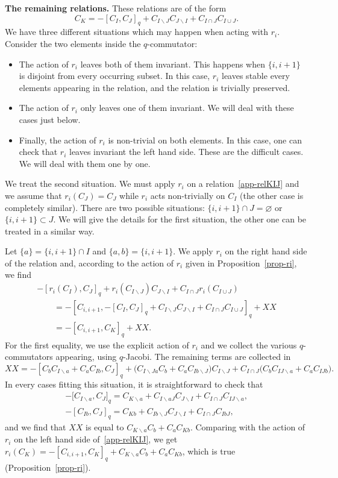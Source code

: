 \documentclass[pdftex]{sigma}
\numberwithin{equation}{section}
\theoremstyle{definition}
\begin{document}
{\bf The remaining relations.} These relations are of the form
\begin{equation}\label{app-relKIJ}
C_{K}=-[C_{I},C_{J}]_q+C_{I\backslash J}C_{J\backslash I}+C_{I\cap J}C_{I\cup J} .
\end{equation}
We have three different situations which may happen when acting with $r_i$. Consider the two elements inside the $q$-commutator:
\begin{itemize}\itemsep=0pt
\item The action of $r_i$ leaves both of them invariant. This happens when $\{i,i+1\}$ is disjoint from every occurring subset. In this case, $r_i$ leaves stable every elements appearing in the relation, and the relation is trivially preserved.
\item The action of $r_i$ only leaves one of them invariant. We will deal with these cases just below.
\item Finally, the action of $r_i$ is non-trivial on both elements. In this case, one can check that $r_i$ leaves invariant the left hand side. These are the difficult cases. We will deal with them one by one.
\end{itemize}
We treat the second situation. We must apply $r_i$ on a relation~\eqref{app-relKIJ}
and we assume that $r_i(C_J)=C_J$ while $r_i$ acts non-trivially on $C_I$ (the other case is completely similar). There are two possible situations: $\{i,i+1\}\cap J=\varnothing$ or $\{i,i+1\}\subset J$. We will give the details for the first situation, the other one can be treated in a similar way.

Let $\{a\}=\{i,i+1\}\cap I$ and $\{a,b\}=\{i,i+1\}$. We apply $r_i$ on the right hand side of the relation and, according to the action of $r_i$ given in Proposition~\ref{prop-ri}, we find
\begin{gather*}
 -[r_i(C_{I}),C_{J}]_q+r_i(C_{I\backslash J})C_{J\backslash I}+C_{I\cap J}r_i(C_{I\cup J})\\
 \qquad = -[C_{i,i+1},-[C_{I},C_{J}]_q+C_{I\backslash J}C_{J\backslash I}+C_{I\cap J}C_{I\cup J}]_q + XX \\
 \qquad = -[C_{i,i+1},C_K]_q + XX .
\end{gather*}
For the first equality, we use the explicit action of $r_i$ and we collect the various $q$-commutators appearing, using $q$-Jacobi. The remaining terms are collected in
\[
XX=-[C_bC_{I\backslash a}+C_aC_{Ib},C_J]_q+\big(C_{I\backslash Ja}C_b+C_aC_{Ib\backslash J}\big)C_{I\backslash J}+C_{I\cap J}\big(C_bC_{IJ\backslash a}+C_aC_{IJb}\big) .\]
In every cases fitting this situation, it is straightforward to check that
\begin{gather*}
-\big[C_{I\backslash a},C_J\big]_q=C_{K\backslash a}+C_{I\backslash aJ}C_{J\backslash I}+C_{I\cap J}C_{IJ\backslash a} ,\\
-[C_{Ib},C_J]_q=C_{Kb}+C_{Ib\backslash J}C_{J\backslash I}+C_{I\cap J}C_{IbJ} ,
\end{gather*}
and we find that $XX$ is equal to $C_{K\backslash a}C_b+C_aC_{Kb}$. Comparing with the action of $r_i$ on the left hand side of~\eqref{app-relKIJ}, we get
$r_i(C_K) = -[C_{i,i+1},C_K]_q +C_{K\backslash a}C_b+C_aC_{Kb}$, which is true (Proposition~\ref{prop-ri}).
\end{document}
